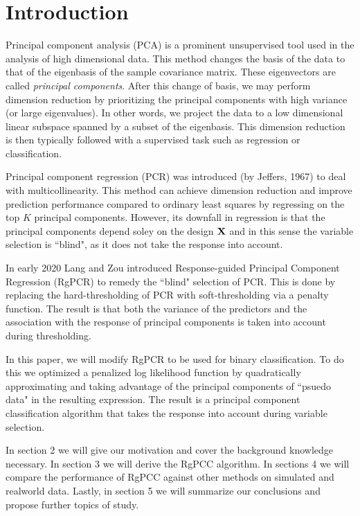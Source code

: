 \documentclass[main.tex]{subfiles}
\begin{document}
\section{Introduction}
Principal component analysis (PCA) is a prominent unsupervised tool used in the analysis of high dimensional data. This method changes the basis of the data to that of the eigenbasis of the sample covariance matrix. These eigenvectors are called \emph{principal components}. After this change of basis, we may perform dimension reduction by prioritizing the principal components with high variance (or large eigenvalues). In other words, we project the data to a low dimensional linear subspace spanned by a subset of the eigenbasis. This dimension reduction is then typically followed with a supervised task such as regression or classification. 

Principal component regression (PCR) was introduced (by Jeffers, 1967) to deal with multicollinearity. This method can achieve dimension reduction and improve prediction performance compared to ordinary least squares by regressing on the top $K$ principal components. However, its downfall in regression is that the principal components depend soley on the design $\mathbf{X}$ and in this sense the variable selection is ``blind", as it does not take the response into account.


In early 2020 Lang and Zou \cite{langzou} introduced Response-guided Principal Component Regression (RgPCR) to remedy the ``blind" selection of PCR. This is done by replacing the hard-thresholding of PCR with soft-thresholding via a penalty function. The result is that both the variance of the predictors and the association with the response of principal components is taken into account during thresholding.


In this paper, we will modify RgPCR to be used for binary classification. To do this we optimized a penalized log likelihood function by quadratically approximating and taking advantage of the principal components of ``psuedo data" in the resulting expression. The result is a principal component classification algorithm that takes the response into account during variable selection.

In section 2 we will give our motivation and cover the background knowledge necessary. In section 3 we will derive the RgPCC algorithm. In sections 4 we will compare the performance of RgPCC against other methods on simulated and realworld data. Lastly, in section 5 we will summarize our conclusions and propose further topics of study.
\end{document}
